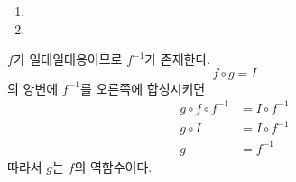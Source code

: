 \documentclass{oblivoir}
\begin{document}
\begin{multicols*}{2}
\newpage
%
\begin{enumerate}
\item
\mbox{}
\item
\mbox{}
\end{enumerate}

%
\(f\)가 일대일대응이므로 \(f^{-1}\)가 존재한다.
\[f\circ g=I\]의 양변에 \(f^{-1}\)를 오른쪽에 합성시키면
\begin{align*}
g\circ f\circ f^{-1}&=I\circ f^{-1}\\
g\circ I&=I\circ f^{-1}\\
g&=f^{-1}
\end{align*}
따라서 \(g\)는 \(f\)의 역함수이다.

%
\end{multicols*}
\end{document}
